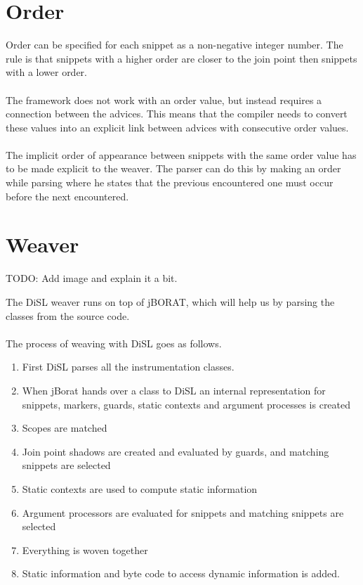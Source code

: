 \documentclass[a4paper]{report}
\begin{document}
\section{Order}
Order can be specified for each snippet as a non-negative integer number. The rule is that snippets with a higher order are closer to the join point then snippets with a lower order.\\
\\
The framework does not work with an order value, but instead requires a connection between the advices. This means that the compiler needs to convert these values into an explicit link between advices with consecutive order values.\\
\\
The implicit order of appearance between snippets with the same order value has to be made explicit to the weaver. The parser can do this by making an order while parsing where he states that the previous encountered one must occur before the next encountered.

\section{Weaver}
TODO: Add image and explain it a bit.

The DiSL weaver runs on top of jBORAT, which will help us by parsing the classes from the source code.\\
\\
The process of weaving with DiSL goes as follows.
\begin{enumerate}
\item First DiSL parses all the instrumentation classes.
\item When jBorat hands over a class to DiSL an internal representation for snippets, markers, guards, static contexts and argument processes is created
\item Scopes are matched
\item Join point shadows are created and evaluated by guards, and matching snippets are selected
\item Static contexts are used to compute static information
\item Argument processors are evaluated for snippets and matching snippets are selected
\item Everything is woven together
\item Static information and byte code to access dynamic information is added.
\end{enumerate}
\end{document}
